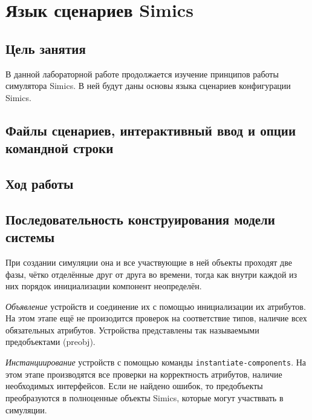 \chapter{Язык сценариев Simics}\label{chap:scripting}

\section{Цель занятия}

В данной лабораторной работе продолжается изучение принципов работы симулятора Simics. В ней будут даны основы языка сценариев конфигурации Simics.

\section[Файлы, интерактивный ввод и опции]{Файлы сценариев, интерактивный ввод и опции командной строки}

\todo

\section{Ход работы}

\todo 


\section{Последовательность конструирования модели системы}

При создании симуляции она и все участвующие в ней объекты проходят две фазы, чётко отделённые друг от друга во времени, тогда как внутри каждой из них порядок инициализации компонент неопределён.

\begin{enumerate*}

\item \textit{Объявление} устройств и соединение их с помощью инициализации их атрибутов. На этом этапе ещё не произодится проверок на соответствие типов, наличие всех обязательных атрибутов. Устройства представлены так называемыми предобъектами (\abbr preobj).

\item \textit{Инстанциирование} устройств с помощью команды \texttt{instantiate-components}. На этом этапе производятся все проверки на корректность атрибутов, наличие необходимых интерфейсов. Если не найдено ошибок, то предобъекты преобразуются в полноценные объекты Simics, которые могут участввать в симуляции.

\end{enumerate*}

